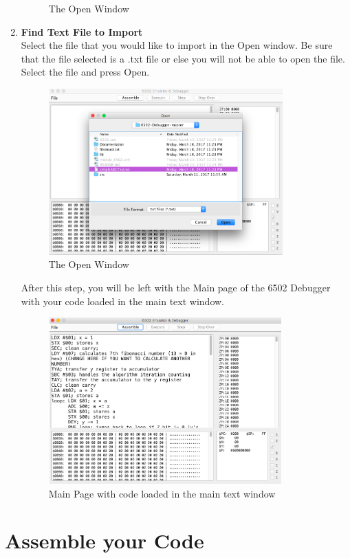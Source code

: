\documentclass[a3paper, 11pt]{article}
\begin{document}
\begin{enumerate}
\begin{figure}[h!]
		\caption{The Open Window}
	\end{figure}
	\clearpage
	\item \textbf{Find Text File to Import}\\
	Select the file that you would like to import in the Open window. Be sure that the file selected is a .txt file or else you will not be able to open the file. Select the file and press Open.
	\begin{figure}[h!]
		\centering
		\includegraphics[width=9cm, height=6.4cm]{SelectFile}
		\caption{The Open Window}
	\end{figure}
	\par
	After this step, you will be left with the Main page of the 6502 Debugger with your code loaded in the main text window. 
	\begin{figure}[h!]
		\centering
		\includegraphics[width=9cm, height=6.4cm]{FibCode}
		\caption{Main Page with code loaded in the main text window}
	\end{figure}	
\end{enumerate}
\clearpage

\section{Assemble your Code}
\end{document}
